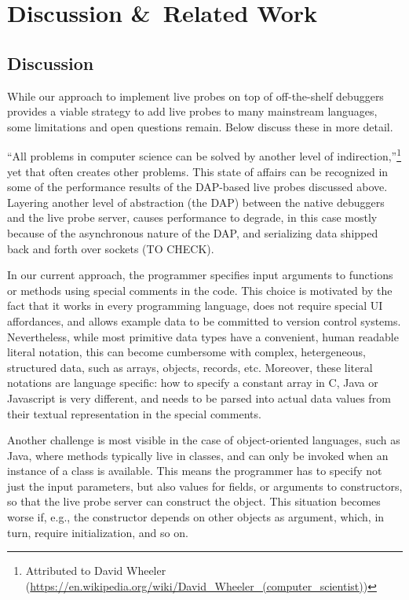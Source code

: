 \documentclass[english,submission]{programming}
\begin{document}
\section{Discussion \&\ Related Work}
\label{sec:related-work}

\subsection{Discussion}

While our approach to implement live probes on top of off-the-shelf debuggers provides a viable strategy to add live probes to many mainstream languages, some limitations and open questions remain. Below discuss these in more detail.

``All problems in computer science can be solved by another level of indirection,''\footnote{Attributed to David Wheeler (\url{https://en.wikipedia.org/wiki/David_Wheeler_(computer_scientist)})} yet that often creates other problems. This state of affairs can be recognized in some of the performance results of the DAP-based live probes discussed above. Layering another level of abstraction (the DAP) between the native debuggers and the live probe server, causes performance to degrade, in this case mostly because of the asynchronous nature of the DAP, and serializing data shipped back and forth over sockets (TO CHECK). 


In our current approach, the programmer specifies input arguments to functions or methods using special comments in the code. This choice is motivated by the fact that it works in every programming language, does not require special UI affordances, and allows example data to be committed to version control systems. Nevertheless, while most primitive data types have a convenient, human readable literal notation, this can become cumbersome with complex, hetergeneous, structured data, such as arrays, objects, records, etc.  Moreover, these literal notations are language specific: how to specify a constant array in C, Java or Javascript is very different, and needs to be parsed into actual data values from their textual representation in the special comments. 

Another challenge is most visible in the case of object-oriented languages, such as Java, where methods typically live in classes, and can only be invoked when an instance of a class is available. This means the programmer has to specify not just the input parameters, but also values for fields, or arguments to constructors, so that the live probe server can construct the object. This situation becomes worse if, e.g., the constructor depends on other objects as argument, which, in turn, require initialization, and so on.
\end{document}
